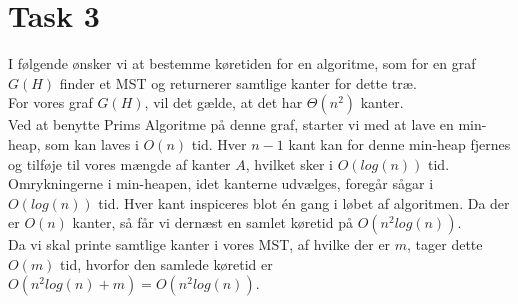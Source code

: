 \section{Task 3}
I følgende ønsker vi at bestemme køretiden for en algoritme, som for en graf $G(H)$ finder et MST og returnerer samtlige kanter for dette træ.\\ 

For vores graf $G(H)$, vil det gælde, at det har $\Theta(n^2)$ kanter.\\
Ved at benytte Prims Algoritme på denne graf, starter vi med at lave en min-heap, som kan laves i $O(n)$ tid. Hver $n-1$ kant kan for denne min-heap fjernes og tilføje til vores mængde af kanter $A$, hvilket sker i $O(log(n))$ tid. Omrykningerne i min-heapen, idet kanterne udvælges, foregår sågar i $O(log(n))$ tid.
Hver kant inspiceres blot én gang i løbet af algoritmen. Da der er $O(n)$ kanter, så får vi dernæst en samlet køretid på $O(n^2log(n))$.\\
Da vi skal printe samtlige kanter i vores MST, af hvilke der er $m$, tager dette$O(m)$ tid, hvorfor den samlede køretid er $O(n^2log(n) + m) = O(n^2log(n))$. 
